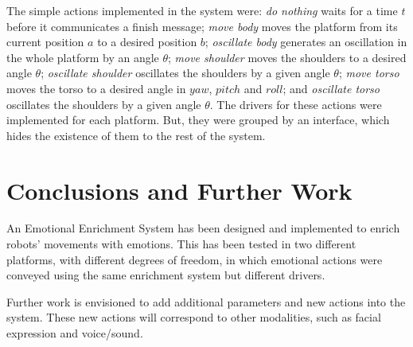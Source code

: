 \documentclass{sig-alternate-05-2015}
\begin{document}
The simple actions implemented in the system were: \textit{do nothing} waits for a time $t$ before it communicates a finish message; \textit{move body} moves the platform from its current position $a$ to a desired position $b$; \textit{oscillate body} generates an oscillation in the whole platform by an angle $\theta$; \textit{move shoulder} moves the shoulders to a desired angle $\theta$; \textit{oscillate shoulder} oscillates the shoulders by a given angle $\theta$; \textit{move torso} moves the torso to a desired angle in $yaw$, $pitch$ and $roll$; and \textit{oscillate torso} oscillates the shoulders by a given angle $\theta$. The drivers for these actions were implemented for each platform. But, they were grouped by an interface, which hides the existence of them to the rest of the system.

\section{Conclusions and Further Work}

An Emotional Enrichment System has been designed and implemented to enrich robots' movements with emotions. %
This has been tested in two different platforms, with different degrees of freedom, in which emotional actions were conveyed using the same enrichment system but different drivers. 

Further work is envisioned to add additional parameters and new actions into the system. These new actions will correspond to other modalities, such as facial expression and voice/sound.


\end{document}
